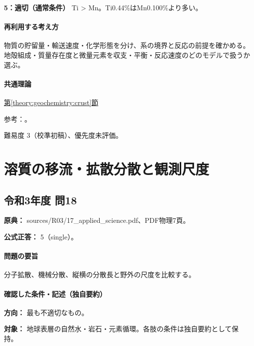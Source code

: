 \noindent\textbf{5：適切（通常条件）} Ti > Mn。Ti0.44\%はMn0.100\%より多い。\par

\paragraph{再利用する考え方} 物質の貯留量・輸送速度・化学形態を分け、系の境界と反応の前提を確かめる。地殻組成・質量存在度と微量元素を収支・平衡・反応速度のどのモデルで扱うか選ぶ。

\paragraph{共通理論} \hyperref[theory:geochemistry:crust]{第\ref*{theory:geochemistry:crust}節}

\par 参考：\cite{gc_crust,gc_hem}。

\par 難易度 3（校準初稿）、優先度未評価。

\section{溶質の移流・拡散分散と観測尺度}

\subsection{令和3年度 問18}
\label{q:r03-reg-applied-18}

\noindent\textbf{原典：} sources/R03/17\_applied\_science.pdf、PDF物理7頁。

\textbf{公式正答：} 5（single）。

\paragraph{問題の要旨} 分子拡散、機械分散、縦横の分散長と野外の尺度を比較する。

\paragraph{確認した条件・記述（独自要約）}\mbox{}\par

\noindent\textbf{方向：} 最も不適切なもの。\par

\noindent\textbf{対象：} 地球表層の自然水・岩石・元素循環。各肢の条件は独自要約として保持。\par

